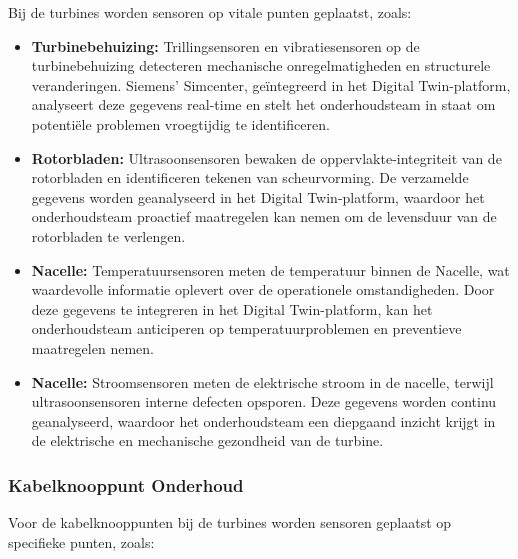 Bij de turbines worden sensoren op vitale punten geplaatst, zoals:

\begin{itemize}
    \item \textbf{Turbinebehuizing:} Trillingsensoren en vibratiesensoren op de turbinebehuizing detecteren mechanische onregelmatigheden en structurele veranderingen. Siemens' Simcenter, geïntegreerd in het Digital Twin-platform, analyseert deze gegevens real-time en stelt het onderhoudsteam in staat om potentiële problemen vroegtijdig te identificeren\cite{5608150}.
    
    \item \textbf{Rotorbladen:} Ultrasoonsensoren bewaken de oppervlakte-integriteit van de rotorbladen en identificeren tekenen van scheurvorming. De verzamelde gegevens worden geanalyseerd in het Digital Twin-platform, waardoor het onderhoudsteam proactief maatregelen kan nemen om de levensduur van de rotorbladen te verlengen\cite{5608150}.
    
    \item \textbf{Nacelle:} Temperatuursensoren meten de temperatuur binnen de Nacelle, wat waardevolle informatie oplevert over de operationele omstandigheden. Door deze gegevens te integreren in het Digital Twin-platform, kan het onderhoudsteam anticiperen op temperatuurproblemen en preventieve maatregelen nemen\cite{5608150}.
    
    \item \textbf{Nacelle:} Stroomsensoren meten de elektrische stroom in de nacelle, terwijl ultrasoonsensoren interne defecten opsporen. Deze gegevens worden continu geanalyseerd, waardoor het onderhoudsteam een diepgaand inzicht krijgt in de elektrische en mechanische gezondheid van de turbine\cite{5608150}.
\end{itemize}

\subsubsection{Kabelknooppunt Onderhoud}

Voor de kabelknooppunten bij de turbines worden sensoren geplaatst op specifieke punten, zoals:

